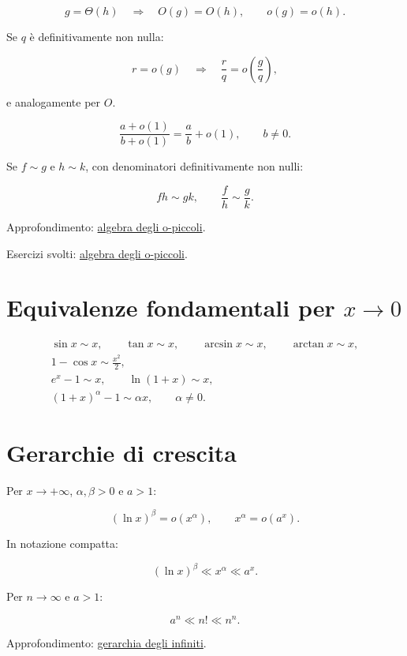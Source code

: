 \[
\displaystyle
g=\Theta(h)
\quad\Longrightarrow\quad
O(g)=O(h),
\qquad
o(g)=o(h).
\]

Se \(q\) è definitivamente non nulla:

\[
\displaystyle
r=o(g)
\quad\Longrightarrow\quad
\frac rq=o\!\left(\frac gq\right),
\]

e analogamente per \(O\).

\[
\displaystyle
\frac{a+o(1)}{b+o(1)}
=\frac ab+o(1),
\qquad b\ne0.
\]

Se \(f\sim g\) e \(h\sim k\), con denominatori definitivamente non nulli:

\[
\displaystyle
fh\sim gk,
\qquad
\frac fh\sim\frac gk.
\]

Approfondimento: \href{https://ingegnerismo.it/matematica/algebra-degli-o-piccoli/}{algebra degli o-piccoli}.

Esercizi svolti: \href{https://ingegnerismo.it/matematica/algebra-degli-o-piccoli-esercizi/}{algebra degli o-piccoli}.

\section{\texorpdfstring{Equivalenze fondamentali per \(x\to0\)}{Equivalenze fondamentali per x\textbackslash to0}}\label{equivalenze-fondamentali-per-xto0}

\[
\begin{gathered}
\sin x\sim x,
\qquad
\tan x\sim x,
\qquad
\arcsin x\sim x,
\qquad
\arctan x\sim x,\\[4pt]
1-\cos x\sim\frac{x^2}{2},\\[4pt]
e^x-1\sim x,
\qquad
\ln(1+x)\sim x,\\[4pt]
(1+x)^\alpha-1\sim\alpha x,
\qquad \alpha\ne0.
\end{gathered}
\]

\section{Gerarchie di crescita}\label{gerarchie-di-crescita}

Per \(x\to+\infty\), \(\alpha,\beta>0\) e \(a>1\):

\[
\displaystyle
(\ln x)^\beta=o(x^\alpha),
\qquad
x^\alpha=o(a^x).
\]

In notazione compatta:

\[
\displaystyle
(\ln x)^\beta\ll x^\alpha\ll a^x.
\]

Per \(n\to\infty\) e \(a>1\):

\[
\displaystyle
a^n\ll n!\ll n^n.
\]

Approfondimento: \href{https://ingegnerismo.it/matematica/gerarchia-degli-infiniti/}{gerarchia degli infiniti}.
